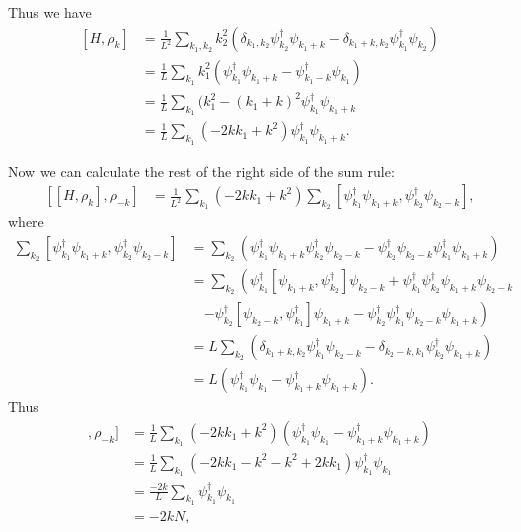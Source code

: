 \documentclass[11pt, a4paper]{report} %
\begin{document}
Thus we have
\begin{align}
  \label{eq:13}
  [H, \rho_k] &= \frac{1}{L^2} \sum_{k_1,k_2} k_2^2  \left( \delta_{k_1,k_2} \psi_{k_2}^{\dag}\psi_{k_1+k} -  \delta_{k_1+k,k_2}\psi_{k_1}^{\dag}\psi_{k_2} \right) \\
              &= \frac{1}{L} \sum_{k_1} k_1^2  \left(\psi_{k_1}^{\dag}\psi_{k_1+k} -  \psi_{k_1-k}^{\dag}\psi_{k_1} \right) \\
              &= \frac{1}{L} \sum_{k_1} (k_1^2 -(k_1+k)^2 \psi_{k_1}^{\dag}\psi_{k_1+k}\\
              &= \frac{1}{L} \sum_{k_1} (-2kk_1+k^2) \psi_{k_1}^{\dag}\psi_{k_1+k}.
\end{align}

Now we can calculate the rest of the right side of the sum rule:
\begin{align}
  \label{eq:14}
  [[H,\rho_k],\rho_{-k}] &= \frac{1}{L^2} \sum_{k_1}(-2kk_1+k^2) \sum_{k_2} [\psi_{k_1}^{\dag}\psi_{k_1+k}, \psi_{k_2}^{\dag}\psi_{k_2-k}],
\end{align}
where
\begin{align}
  \label{eq:15}
   \sum_{k_2} [\psi_{k_1}^{\dag}\psi_{k_1+k}, \psi_{k_2}^{\dag}\psi_{k_2-k}] &=  \sum_{k_2} \left(\psi_{k_1}^{\dag}\psi_{k_1+k} \psi_{k_2}^{\dag}\psi_{k_2-k} - \psi_{k_2}^{\dag}\psi_{k_2-k}\psi_{k_1}^{\dag}\psi_{k_1+k} \right)\\
                                                                             &= \sum_{k_2} \left(\psi_{k_1}^{\dag}[\psi_{k_1+k}, \psi_{k_2}^{\dag}]\psi_{k_2-k} + \psi_{k_1}^{\dag} \psi_{k_2}^{\dag}\psi_{k_1+k}\psi_{k_2-k} \right.\nonumber\\
&\quad\left. - \psi_{k_2}^{\dag}[\psi_{k_2-k},\psi_{k_1}^{\dag}]\psi_{k_1+k} -\psi_{k_2}^{\dag}\psi_{k_1}^{\dag}\psi_{k_2-k}\psi_{k_1+k} \right) \\
                                                                             &= L\sum_{k_2} \left(\delta_{k_1+k,k_2}\psi_{k_1}^{\dag}\psi_{k_2-k} - \delta_{k_2-k,k_1}\psi_{k_2}^{\dag}\psi_{k_1+k}\right) \\
                                                                             &= L \left(\psi_{k_1}^{\dag}\psi_{k_1} - \psi_{k_1+k}^{\dag}\psi_{k_1+k}\right) .
\end{align}
Thus
\begin{align}
  [[H,\rho_k],\rho_{-k}] &= \frac{1}{L} \sum_{k_1}(-2kk_1+k^2) \left(\psi_{k_1}^{\dag}\psi_{k_1} - \psi_{k_1+k}^{\dag}\psi_{k_1+k}\right) \\
                         &=  \frac{1}{L} \sum_{k_1}(-2kk_1-k^2 -k^2+2kk_1) \psi_{k_1}^{\dag}\psi_{k_1}\\
                         &=  \frac{-2k}{L} \sum_{k_1}\psi_{k_1}^{\dag}\psi_{k_1}\\
                         &= -2kN,
\end{align}
\end{document}
